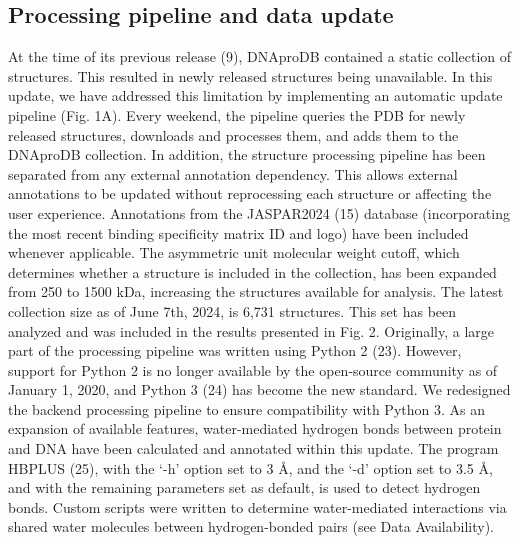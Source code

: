 \subsection{Processing pipeline and data update}
At the time of its previous release (9), DNAproDB contained a static collection of structures. This resulted in newly released structures being unavailable. In this update, we have addressed this limitation by implementing an automatic update pipeline (Fig. 1A). Every weekend, the pipeline queries the PDB for newly released structures, downloads and processes them, and adds them to the DNAproDB collection. 
In addition, the structure processing pipeline has been separated from any external annotation dependency. This allows external annotations to be updated without reprocessing each structure or affecting the user experience. Annotations from the JASPAR2024 (15) database (incorporating the most recent binding specificity matrix ID and logo) have been included whenever applicable. 
The asymmetric unit molecular weight cutoff, which determines whether a structure is included in the collection, has been expanded from 250 to 1500 kDa, increasing the structures available for analysis. The latest collection size as of June 7th, 2024, is 6,731 structures. This set has been analyzed and was included in the results presented in Fig. 2. 
Originally, a large part of the processing pipeline was written using Python 2 (23). However, support for Python 2 is no longer available by the open-source community as of January 1, 2020, and Python 3 (24) has become the new standard. We redesigned the backend processing pipeline to ensure compatibility with Python 3. 
As an expansion of available features, water-mediated hydrogen bonds between protein and DNA have been calculated and annotated within this update. The program HBPLUS (25), with the ‘-h’ option set to 3 Å, and the ‘-d’ option set to 3.5 Å, and with the remaining parameters set as default, is used to detect hydrogen bonds. Custom scripts were written to determine water-mediated interactions via shared water molecules between hydrogen-bonded pairs (see Data Availability).  

